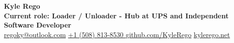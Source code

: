 \documentclass[a4paper,10pt]{article}
\begin{document}

\noindent
\begin{minipage}{\textwidth}
    \raggedright
    \textbf{\Large \textcolor{headertext}{Kyle Rego}}\\[0.3cm] %
    \textbf{\textcolor{headertext}{Current role: Loader / Unloader - Hub at UPS and Independent Software Developer}}\\[0.3cm] %
    \textcolor{headertext}{
        \href{mailto:regoky@outlook.com}{regoky@outlook.com} \textbullet{}  
        \href{tel:15088138530}{+1 (508) 813-8530 \textbullet{}}
        \href{https://github.com/KyleRego}{github.com/KyleRego} \textbullet{} 
        \href{https://kylerego.net}{kylerego.net}
    }\\[0.3cm]
\end{minipage}\\[0.1cm]
\end{document}
